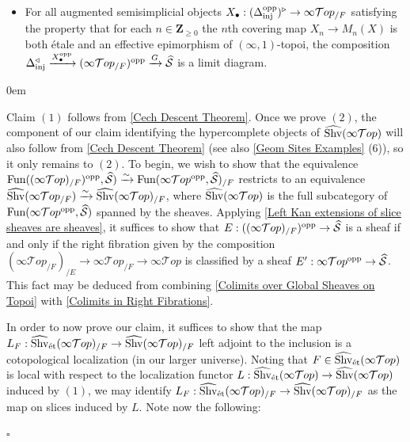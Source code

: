 \documentclass[10pt]{article}
\newcommand{\mS}{\mathcal S}
\newcommand{\cT}{\mathcal{T}}
\newcommand{\ZZ}{\mathbb{Z}}
\def\ZZ{{\mathbf Z}}
\renewcommand{\qed}{\hfill$\square$}
\renewenvironment{proof}{\begin{addmargin}[1em]{0em}\begin{newproof}}{\end{newproof}\end{addmargin}\qed}
\theoremstyle{witharg}
\theoremstyle{witharg}
\theoremstyle{witharg2}
\begin{document}
\begin{proposition}{}
\begin{itemize}
        \item [$(\textnormal{ii})$] For all augmented semisimplicial objects $X_\bullet:(\Delta_{\textnormal{inj}}^{\textnormal{opp}})^\triangleright\rightarrow \infty\cT op_{/F}$ satisfying the property that for each $n\in \ZZ_{\geq 0}$ the $n$th covering map $X_n\rightarrow M_n(X)$ is both \'{e}tale and an effective epimorphism of $(\infty,1)$-topoi, the composition $\Delta_{\textnormal{inj}}^\triangleleft\xrightarrow{X^{\textnormal{opp}}_\bullet} (\infty\cT op_{/F})^{\textnormal{opp}}\xrightarrow{G} \widehat{\mS}$ is a limit diagram. 

        
    \end{itemize}
    
\end{proposition}

\begin{proof}

Claim $(1)$ follows from \ref{Cech Descent Theorem}. Once we prove $(2)$,  the component of our claim identifying the hypercomplete objects of $\widehat{\textnormal{Shv}}(\infty\cT op)$ will also follow from \ref{Cech Descent Theorem} (see also \ref{Geom Sites Examples} (6)), so it only remains to $(2)$. To begin, we wish to show that the equivalence $\textnormal{Fun}((\infty\cT op)_{/F})^{\textnormal{opp}},\widehat{\mS})\xrightarrow{\sim} \textnormal{Fun}(\infty\cT op^{\textnormal{opp}},\widehat{\mS})_{/F}$ restricts to an equivalence $\widehat{\textnormal{Shv}}(\infty\cT op_{/F})\xrightarrow{\sim}\widehat{\textnormal{Shv}}(\infty\cT op)_{/F}$, where $\widehat{\textnormal{Shv}}(\infty\cT op)$ is the full subcategory of $\textnormal{Fun}(\infty\cT op^{\textnormal{opp}},\widehat{\mS})$ spanned by the sheaves. Applying \ref{Left Kan extensions of slice sheaves are sheaves}, it suffices to show that $E:((\infty\cT op)_{/F})^{\textnormal{opp}}\rightarrow \widehat{\mS}$ is a sheaf if and only if the right fibration given by the composition $(\infty\cT op_{/F})_{/E}\rightarrow \infty\cT op_{/F}\rightarrow \infty\cT op$ is classified by a sheaf $E^\prime:\infty\cT op^\textnormal{opp}\rightarrow \widehat{\mS}$. This fact may be deduced from combining \ref{Colimits over Global Sheaves on Topoi} with \ref{Colimits in Right Fibrations}.



In order to now prove our claim, it suffices to show that the map $L_F:\widehat{\textnormal{Shv}}_{\textnormal{\'{e}t}}(\infty\cT op)_{/F}\rightarrow \widehat{\textnormal{Shv}}(\infty\cT op)_{/F}$ left adjoint to the inclusion is a cotopological localization (in our larger universe). Noting that $F\in \widehat{\textnormal{Shv}}_{\textnormal{\'{e}t}}(\infty\cT op)$ is local with respect to the localization functor $L:\widehat{\textnormal{Shv}}_{\textnormal{\'{e}t}}(\infty\cT op)\rightarrow \widehat{\textnormal{Shv}}(\infty\cT op)$ induced by $(1)$, we may identify $L_F:\widehat{\textnormal{Shv}}_{\textnormal{\'{e}t}}(\infty\cT op)_{/F}\rightarrow \widehat{\textnormal{Shv}}(\infty\cT op)_{/F}$ as the map on slices induced by $L$. Note now the following:


\end{proof}
\end{document}

